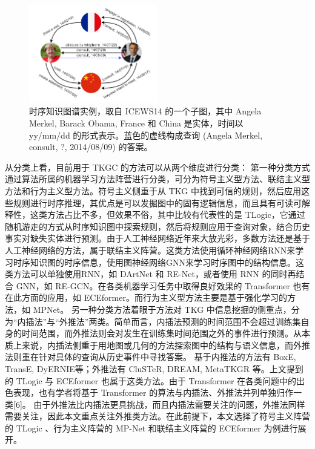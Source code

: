 \documentclass[a4paper, AutoFakeBold]{article}
\begin{document}
\begin{figure}
	\captionsetup{width=0.8\textwidth}
	\centering
	\includegraphics[width=0.5\textwidth]{figures/TKG.png}
	\caption{时序知识图谱实例，取自 ICEWS14 的一个子图，其中 Angela Merkel, Barack Obama, France 和 China 是实体，时间以 yy/mm/dd 的形式表示。蓝色的虚线构成查询 (Angela Merkel, consult, ?, 2014/08/09) 的答案。\cite{3-2022}}
\end{figure}



从分类上看，目前用于 TKGC 的方法可以从两个维度进行分类：
第一种分类方式通过算法所属的机器学习方法阵营进行分类，可分为符号主义型方法、联结主义型方法和行为主义型方法。符号主义侧重于从 TKG 中找到可信的规则，然后应用这些规则进行时序推理，其优点是可以发掘图中的固有逻辑信息，而且具有可读可解释性，这类方法占比不多，但效果不俗，其中比较有代表性的是 TLogic，它通过随机游走的方式从时序知识图中探索规则，然后将规则应用于查询对象，结合历史事实对缺失实体进行预测。由于人工神经网络近年来大放光彩，多数方法还是基于人工神经网络的方法，属于联结主义阵营。这类方法使用循环神经网络RNN来学习时序知识图的时序信息，使用图神经网络GNN来学习时序图中的结构信息。这类方法可以单独使用RNN，如 DArtNet\cite{5-2020} 和 RE-Net\cite{12-2020}，或者使用 RNN 的同时再结合 GNN，如 RE-GCN\cite{7-2021}。在各类机器学习任务中取得良好效果的 Transformer 也有在此方面的应用，如 ECEformer\cite{6-2024}。而行为主义型方法主要是基于强化学习的方法，如 MPNet\cite{4-2024}。
另一种分类方法着眼于方法对 TKG 中信息挖掘的侧重点，分为“内插法”与“外推法”两类。简单而言，内插法预测的时间范围不会超过训练集自身的时间范围，而外推法则会对发生在训练集时间范围之外的事件进行预测。从本质上来说，内插法侧重于用地图或几何的方法探索图中的结构与语义信息，而外推法则重在针对具体的查询从历史事件中寻找答案。
基于内推法的方法有 BoxE\cite{14-2020}, TransE\cite{15-2024}, DyERNIE\cite{16-2020}等；外推法有 CluSTeR\cite{17-2021}, DREAM\cite{18-2023}, MetaTKGR\cite{13-2022} 等。上文提到的 TLogic 与 ECEformer 也属于这类方法。由于 Transformer 在各类问题中的出色表现，也有学者将基于 Transformer 的算法与内插法、外推法并列单独归作一类[6]。
由于外推法比内插法更具挑战，而且内插法需要关注的问题，外推法同样需要关注，因此本文重点关注外推类方法。在此前提下，本文选择了符号主义阵营的 TLogic 、行为主义阵营的 MP-Net 和联结主义阵营的 ECEformer 为例进行展开。
\end{document}
